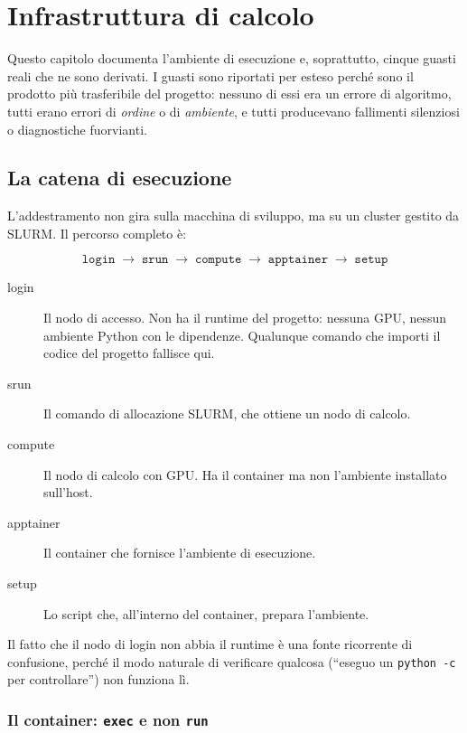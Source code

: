 \chapter{Infrastruttura di calcolo}
\label{cap:infrastruttura}

Questo capitolo documenta l'ambiente di esecuzione e, soprattutto, cinque guasti
reali che ne sono derivati. I guasti sono riportati per esteso perché sono il
prodotto più trasferibile del progetto: nessuno di essi era un errore di
algoritmo, tutti erano errori di \emph{ordine} o di \emph{ambiente}, e tutti
producevano fallimenti silenziosi o diagnostiche fuorvianti.

\section{La catena di esecuzione}

L'addestramento non gira sulla macchina di sviluppo, ma su un cluster gestito da
SLURM. Il percorso completo è:

\begin{equation}
  \texttt{login} \;\to\; \texttt{srun} \;\to\; \texttt{compute}
  \;\to\; \texttt{apptainer} \;\to\; \texttt{setup}
\end{equation}

\begin{description}
  \item[login] Il nodo di accesso. Non ha il runtime del progetto: nessuna GPU,
        nessun ambiente Python con le dipendenze. Qualunque comando che importi
        il codice del progetto fallisce qui.
  \item[srun] Il comando di allocazione SLURM, che ottiene un nodo di calcolo.
  \item[compute] Il nodo di calcolo con GPU. Ha il container ma non l'ambiente
        installato sull'host.
  \item[apptainer] Il container che fornisce l'ambiente di esecuzione.
  \item[setup] Lo script che, all'interno del container, prepara l'ambiente.
\end{description}

Il fatto che il nodo di login non abbia il runtime è una fonte ricorrente di
confusione, perché il modo naturale di verificare qualcosa (``eseguo un
\texttt{python -c} per controllare'') non funziona lì.

\subsection{Il container: \texttt{exec} e non \texttt{run}}

